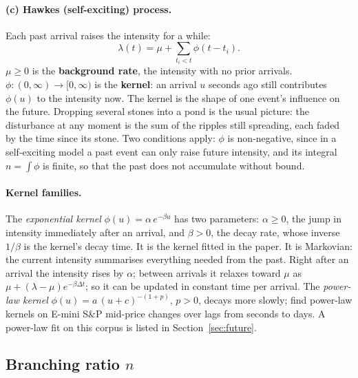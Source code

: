 \paragraph{(c) Hawkes (self-exciting) process.} Each past arrival raises the intensity
for a while:
$$\lambda(t) = \mu + \sum_{t_i < t} \phi(t - t_i).$$
$\mu \geq 0$ is the \textbf{background rate}, the intensity with no prior arrivals.
$\phi : (0, \infty) \to [0, \infty)$ is the \textbf{kernel}: an arrival $u$ seconds ago
still contributes $\phi(u)$ to the intensity now. The kernel is the shape of one event's
influence on the future. Dropping several stones into a pond is the usual picture: the
disturbance at any moment is the sum of the ripples still spreading, each faded by the
time since its stone. Two conditions apply: $\phi$ is non-negative, since in a
self-exciting model a past event can only raise future intensity, and its integral
$n = \int \phi$ is finite, so that the past does not accumulate without bound.

\paragraph{Kernel families.} The \emph{exponential kernel}
$\phi(u) = \alpha\, e^{-\beta u}$ has two parameters: $\alpha \geq 0$, the jump in
intensity immediately after an arrival, and $\beta > 0$, the decay rate, whose inverse
$1/\beta$ is the kernel's decay time. It is the kernel fitted in the paper. It is
Markovian: the current intensity summarises everything needed from the past. Right after
an arrival the intensity rises by $\alpha$; between arrivals it relaxes toward $\mu$ as
$\mu + (\lambda - \mu) e^{-\beta \Delta t}$; so it can be updated in constant time per
arrival. The \emph{power-law kernel} $\phi(u) = a\,(u + c)^{-(1+p)}$, $p > 0$, decays more
slowly; \citet{hardimanbercotbouchaud2013} find power-law kernels on E-mini S\&P
mid-price changes over lags from seconds to days. A power-law fit on this corpus is
listed in Section~\ref{sec:future}.

\subsection{Branching ratio $n$}
\label{app:pp-branching}

